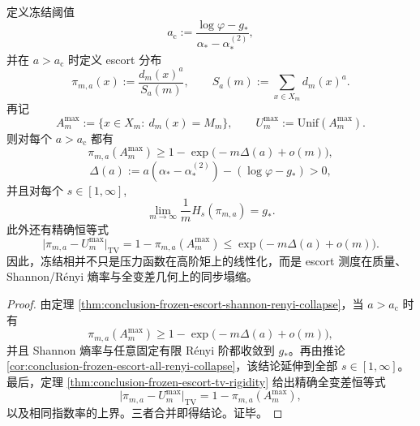 \begin{theorem}[冻结相的全轴熵与全变差塌缩]\label{thm:conclusion-freezing-measure-collapse-all-axes}
定义冻结阈值
\[
a_{\mathrm c}:=\frac{\log\varphi-g_\ast}{\alpha_\ast-\alpha_\ast^{(2)}},
\]
并在 \(a>a_{\mathrm c}\) 时定义 escort 分布
\[
\pi_{m,a}(x):=\frac{d_m(x)^a}{S_a(m)},
\qquad
S_a(m):=\sum_{x\in X_m}d_m(x)^a.
\]
再记
\[
A_m^{\max}:=\{x\in X_m:\ d_m(x)=M_m\},
\qquad
U_m^{\max}:=\mathrm{Unif}(A_m^{\max}).
\]
则对每个 \(a>a_{\mathrm c}\) 都有
\[
\pi_{m,a}(A_m^{\max})
\ge
1-\exp\!\bigl(-m\Delta(a)+o(m)\bigr),
\]
\[
\Delta(a):=a(\alpha_\ast-\alpha_\ast^{(2)})-(\log\varphi-g_\ast)>0,
\]
并且对每个 \(s\in[1,\infty]\),
\[
\lim_{m\to\infty}\frac{1}{m}H_s(\pi_{m,a})=g_\ast.
\]
此外还有精确恒等式
\[
\bigl|\pi_{m,a}-U_m^{\max}\bigr|_{\mathrm{TV}}
=
1-\pi_{m,a}(A_m^{\max})
\le
\exp\!\bigl(-m\Delta(a)+o(m)\bigr).
\]
因此，冻结相并不只是压力函数在高阶矩上的线性化，而是 escort 测度在质量、Shannon/R\'enyi 熵率与全变差几何上的同步塌缩。
\end{theorem}
\begin{proof}
由定理 \ref{thm:conclusion-frozen-escort-shannon-renyi-collapse}，当 \(a>a_{\mathrm c}\) 时有
\[
\pi_{m,a}(A_m^{\max})
\ge
1-\exp\!\bigl(-m\Delta(a)+o(m)\bigr),
\]
并且 Shannon 熵率与任意固定有限 Rényi 阶都收敛到 \(g_\ast\)。再由推论 \ref{cor:conclusion-frozen-escort-all-renyi-collapse}，该结论延伸到全部 \(s\in[1,\infty]\)。最后，定理 \ref{thm:conclusion-frozen-escort-tv-rigidity} 给出精确全变差恒等式
\[
\bigl|\pi_{m,a}-U_m^{\max}\bigr|_{\mathrm{TV}}
=
1-\pi_{m,a}(A_m^{\max}),
\]
以及相同指数率的上界。三者合并即得结论。证毕。
\end{proof}

